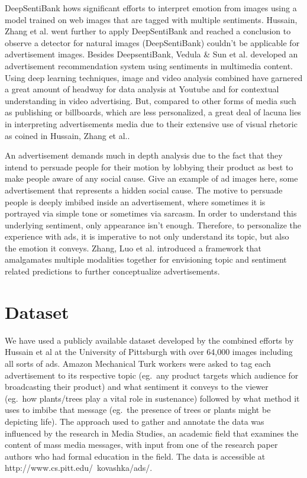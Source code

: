 \documentclass[conference]{IEEEtran}
\begin{document}
DeepSentiBank\cite{b10} hows significant efforts to interpret emotion from images using a model trained on web images that are tagged with multiple sentiments. Hussain, Zhang et al.\cite{b11} went further to apply DeepSentiBank and reached a conclusion to observe a detector for natural images (DeepSentiBank) couldn’t be applicable for advertisement images. Besides DeepsentiBank, Vedula \& Sun et al.\cite{b12} developed an advertisement recommendation system using sentiments in multimedia content. Using deep learning techniques, image and video analysis combined have garnered a great amount of headway for data analysis at Youtube and for contextual understanding in video advertising\cite{b13}. But, compared to other forms of media such as publishing or billboards, which are less personalized, a great deal of lacuna lies in interpreting advertisements media due to their extensive use of visual rhetoric as coined in Hussain, Zhang et al.\cite{b11}. 

An advertisement demands much in depth analysis due to the fact that they intend to persuade people for their motion by lobbying their product as best to make people aware of any social cause. Give an example of ad images here, some advertisement that represents a hidden social cause. The motive to persuade people is deeply imbibed inside an advertisement, where sometimes it is portrayed via simple tone or sometimes via sarcasm. In order to understand this underlying sentiment, only appearance isn’t enough. Therefore, to personalize the experience with ads, it is imperative to  not only understand its topic, but also the emotion it conveys. Zhang, Luo et al.\cite{b14} introduced a framework that amalgamates multiple modalities together for envisioning topic and sentiment related predictions to further conceptualize advertisements.

\section{Dataset} \label{sec:dataset}

We have used a publicly available dataset developed by the combined efforts by Hussain et al at the University of Pittsburgh with over 64,000 images including all sorts of ads. Amazon Mechanical Turk workers were asked to tag each advertisement to its respective topic (eg.\ any product targets which audience for broadcasting their product) and what sentiment it conveys to the viewer (eg.\ how plants/trees play a vital role in sustenance) followed by what method it uses to imbibe that message (eg.\ the presence of trees or plants might be depicting life). The approach used to gather and annotate the data was influenced by the research in Media Studies, an academic field that examines the content of mass media messages, with input from one of the research paper authors\cite{b11
} who had formal education in the field. The data is accessible at http://www.cs.pitt.edu/~kovashka/ads/.
\end{document}
